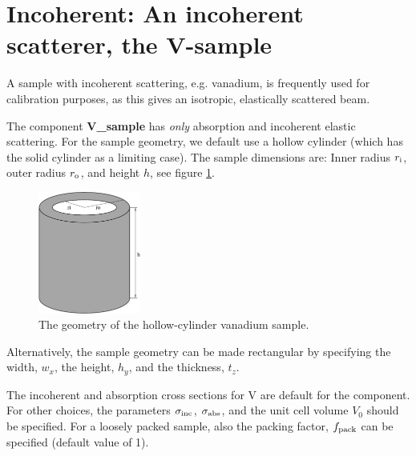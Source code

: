 \section{Incoherent: An incoherent scatterer, the V-sample}
\label{s:v_sample}



A sample with incoherent scattering, e.g. vanadium, is frequently used for
calibration purposes, as this gives an isotropic, elastically scattered beam.

The component {\bf V\_sample}
has {\em only} absorption and incoherent elastic scattering.
For the sample geometry, we default use a
hollow cylinder (which has the solid cylinder as a limiting case).
The sample dimensions are: Inner radius $r_{\rm i}$,
outer radius $r_{\rm o}$, and height $h$, see figure \ref{f:v-sample}.
\begin{figure}
  \begin{center}
    \includegraphics[width=0.3\textwidth]{figures/vsample}
  \end{center}
\caption{The geometry of the hollow-cylinder vanadium sample.}
\label{f:v-sample}
\end{figure}

Alternatively, the sample geometry can be made rectangular
by specifying the width, $w_x$, the height, $h_y$, and the thickness, $t_z$.

The incoherent and absorption cross sections for V are default
for the component. For other choices, the
parameters $\sigma_{\rm inc}$, $\sigma_{\rm abs}$,
and the unit cell volume $V_0$ should be specified.
For a loosely packed sample, also the packing factor, $f_{\rm pack}$
can be specified (default value of 1).

